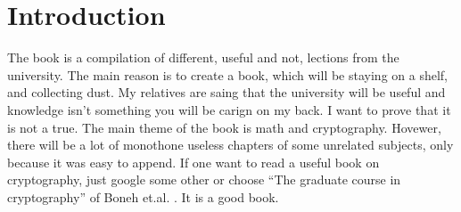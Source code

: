 \chapter{Introduction}

The book is a compilation of different, useful and not, lections from the university. The main reason is to create a book, which will be staying on a shelf, and collecting dust. My relatives are saing that the university will be useful and knowledge isn't something you will be carign on my back. I want to prove that it is not a true. The main theme of the book is math and cryptography. Hovewer, there will be a lot of monothone useless chapters of some unrelated subjects, only because it was easy to append. If one want to read a useful book on cryptography, just google some other or choose ``The graduate course in cryptography'' of Boneh et.al. \cite{Boneh2015}. It is a good book.